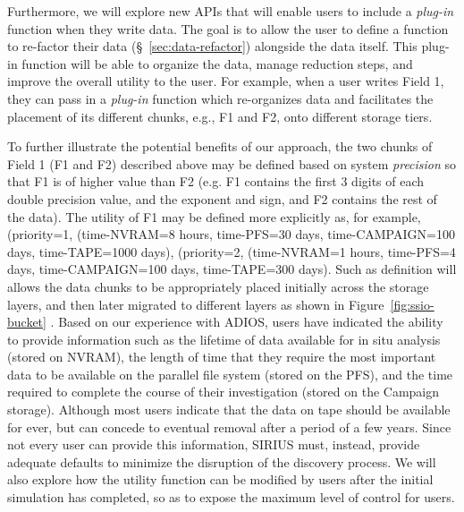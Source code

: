 Furthermore, we will explore new APIs that will enable users to include a {\it plug-in} function when 
they write data. The goal is to allow the user to define a function 
to re-factor their data (\S~\ref{sec:data-refactor}) alongside the data
itself. This plug-in function will be able to organize the data, manage
reduction steps, and improve the overall utility to the user. 
For example, when a user writes Field 1, they can pass in a {\it plug-in} function 
which re-organizes data and facilitates the 
placement of its different chunks, e.g., F1 and F2,  onto different storage
tiers.

To further illustrate the potential benefits of our approach, the two chunks of Field 1 (F1 and F2) 
described above may be defined based on system {\it precision} so that F1 is of higher value 
than F2 (e.g. F1 contains the first 3 digits of each double precision value, and the exponent and 
sign, and F2 contains the rest of the data). 
%
The utility of F1 may be defined more explicitly as, for example, 
(priority=1, (time-NVRAM=8 hours, time-PFS=30 days, time-CAMPAIGN=100 days, time-TAPE=1000 days), 
(priority=2, (time-NVRAM=1 hours, time-PFS=4 days, time-CAMPAIGN=100 days, time-TAPE=300 days).
Such as definition will allows the data chunks to be appropriately placed  initially across the storage layers, 
and then later migrated to different layers as shown in Figure~\ref{fig:ssio-bucket} . 
Based on our experience with ADIOS, users
have indicated the ability to provide information such as the lifetime of
data available for in situ analysis (stored on NVRAM), the length of time
that they require the most important data to be available on the parallel
file system (stored on the PFS), and the time required to complete the
course of their investigation (stored on the Campaign storage). Although
most users indicate that the data on tape should be available for ever, but
can concede to eventual removal after a period of a few years. Since not
every user can provide this information, SIRIUS must, instead, provide
adequate defaults to minimize the disruption of the discovery process. We
will also explore how the utility function can be modified by users after
the initial simulation has completed, so as to expose the maximum level of
control for users. 

